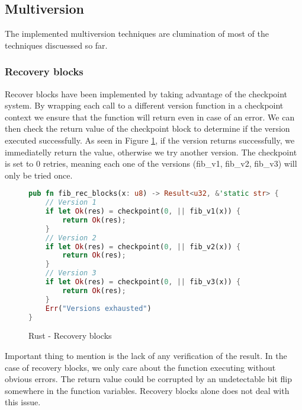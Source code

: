 \subsection{Multiversion}

The implemented multiversion techniques are clumination of most of the techniques discuessed so far.

\subsubsection{Recovery blocks}

Recover blocks have been implemented by taking advantage of the checkpoint system. By wrapping each call to a different version function in a checkpoint context we ensure that the function will return even in case of an error. We can then check the return value of the checkpoint block to determine if the version executed successfully. As seen in Figure \ref{fig:recover_blocks}, if the version returns successfully, we immediatelly return the value, otherwise we try another version. The checkpoint is set to 0 retries, meaning each one of the versions (fib\_v1, fib\_v2, fib\_v3) will only be tried once.

\begin{figure}[!h]
\begin{lstlisting}[language=Rust]
pub fn fib_rec_blocks(x: u8) -> Result<u32, &'static str> {
    // Version 1
    if let Ok(res) = checkpoint(0, || fib_v1(x)) {
        return Ok(res);
    }
    // Version 2
    if let Ok(res) = checkpoint(0, || fib_v2(x)) {
        return Ok(res);
    }
    // Version 3
    if let Ok(res) = checkpoint(0, || fib_v3(x)) {
        return Ok(res);
    }
    Err("Versions exhausted")
}
\end{lstlisting}
\caption{Rust - Recovery blocks}
\label{fig:recover_blocks}
\end{figure}

Important thing to mention is the lack of any verification of the result. In the case of recovery blocks, we only care about the function executing without obvious errors. The return value could be corrupted by an undetectable bit flip somewhere in the function variables. Recovery blocks alone does not deal with this issue.